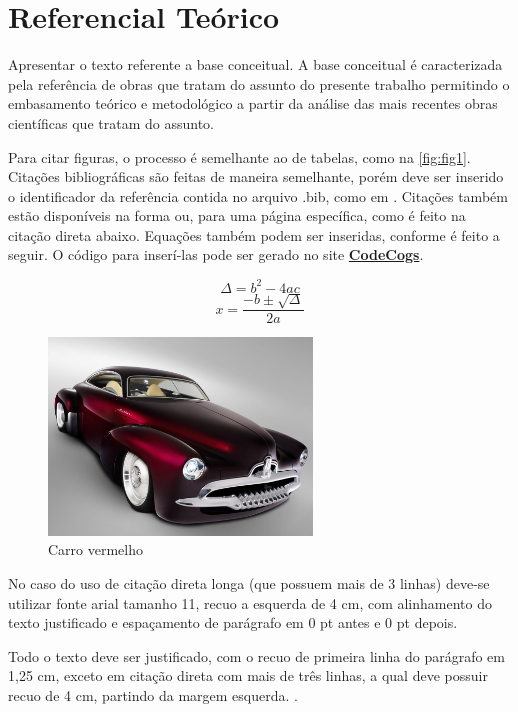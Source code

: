 \section{Referencial Teórico}

Apresentar o texto referente a base conceitual. A base conceitual é caracterizada pela referência de obras que tratam do assunto do presente trabalho permitindo o embasamento teórico e metodológico a partir da análise das mais recentes obras científicas que tratam do assunto.

Para citar figuras, o processo é semelhante ao de tabelas, como na \autoref{fig:fig1}.  Citações bibliográficas são feitas de maneira semelhante, porém deve ser inserido o identificador da referência contida no arquivo .bib, como em \cite{lange1998programming}. Citações também estão disponíveis na forma \textcite{lange1998programming} ou, para uma página específica, como é feito na citação direta abaixo. Equações também podem ser inseridas, conforme é feito a seguir. O código para inserí-las pode ser gerado no site \href{https://www.codecogs.com/latex/eqneditor.php?lang=pt-br}{\textbf{CodeCogs}}.

\[\Delta =b^{2}-4ac\]
\[x=\frac{-b\pm\sqrt{\Delta }}{2a}\]

\begin{figure}[htbp]
    \centering
    \includegraphics[width=7cm]{anexos/fig1.jpg} %
    \caption{
    Carro vermelho
    }
    \label{fig:fig1} %
\end{figure}

No caso do uso de citação direta longa (que possuem mais de 3 linhas) deve-se utilizar fonte arial tamanho 11, recuo a esquerda de 4 cm, com alinhamento do texto justificado e espaçamento de parágrafo em 0 pt antes e 0 pt depois.

\begingroup
{}
\small{

\noindent
Todo o texto deve ser justificado, com o recuo de primeira linha do parágrafo em 1,25 cm, exceto em citação direta com mais de três linhas, a qual deve possuir recuo de 4 cm, partindo da margem esquerda. \textcite[p. 13]{lange1998programming}.
\setlength{\parskip}{0pt}

}
\endgroup